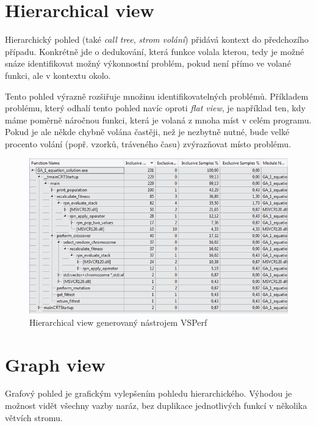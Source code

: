 \documentclass[czech,BP]{thesiskiv}
\begin{document}
\newpage

\section{Hierarchical view}

Hierarchický pohled (také \emph{call tree}, \emph{strom volání}) přidává kontext do předchozího případu. Konkrétně jde o dedukování, která funkce volala kterou, tedy je možné snáze identifikovat možný výkonnostní problém, pokud není přímo ve volané funkci, ale v kontextu okolo.

Tento pohled výrazně rozšiřuje množinu identifikovatelných problémů. Příkladem problému, který odhalí tento pohled navíc oproti \emph{flat view}, je například ten, kdy máme poměrně náročnou funkci, která je volaná z mnoha míst v celém programu. Pokud je ale někde chybně volána častěji, než je nezbytně nutné, bude velké procento volání (popř. vzorků, tráveného času) zvýrazňovat místo problému.

\begin{figure}[h]
    \centering
    \includegraphics[interpolate,width=1.0\textwidth]{img/prof_calltree.png}
    \caption{Hierarchical view generovaný nástrojem VSPerf}
    \label{obr:hieview}
\end{figure}

\section{Graph view}

Grafový pohled je grafickým vylepšením pohledu hierarchického. Výhodou je možnost vidět všechny vazby naráz, bez duplikace jednotlivých funkcí v několika větvích stromu.
\end{document}
